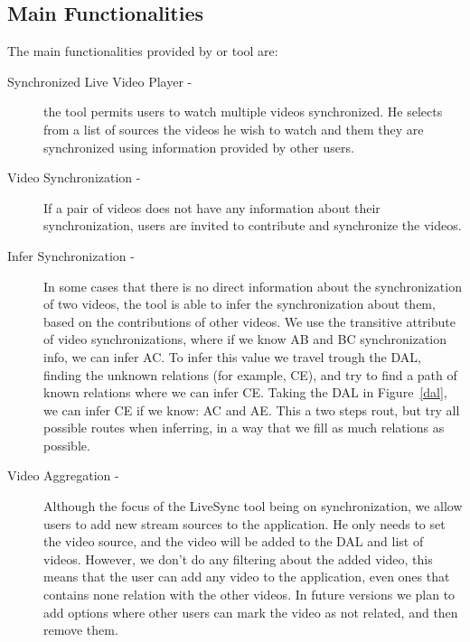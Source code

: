 \documentclass{sig-alternate-05-2015}
\begin{document}
\subsection{Main Functionalities}
The main functionalities provided by or tool are:
\begin{description}
	\item[Synchronized Live Video Player -]	the tool permits users to watch multiple videos synchronized. He selects from a list of sources the videos he wish to watch and them they are synchronized using information provided by other users.
	
	\item[Video Synchronization -] If a pair of videos does not have any information about their synchronization, users are invited to contribute and synchronize the videos.
	
	\item[Infer Synchronization -] In some cases that there is no direct information about the synchronization of two videos, the tool is able to infer the synchronization about them, based on the contributions of other videos. We use the transitive attribute of video synchronizations, where if we know AB and BC synchronization info, we can infer AC. To infer this value we travel trough the DAL, finding the unknown relations (for example, CE), and try to find a path of known relations where we can infer CE. Taking the DAL in Figure~\ref{dal}, we can infer CE if we know: AC and AE. This a two steps rout, but try all possible routes when inferring, in a way that we fill as much relations as possible.
	
	\item[Video Aggregation -]	Although the focus of the LiveSync tool being on synchronization, we allow users to add new stream sources to the application. He only needs to set the video source, and the video will be added to the DAL and list of videos. However, we don't do any filtering about the added video, this means that the user can add any video to the application, even ones that contains none relation with the other videos. In future versions we plan to add options where other users can mark the video as not related, and then remove them.
	

\end{description}
\end{document}
